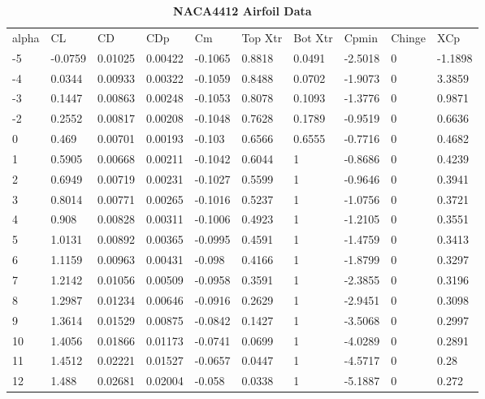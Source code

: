 \begin{singlespace}
\begin{table}[H]
\caption{\textbf{NACA4412 Airfoil Data}} \label{table:NACA4412_raw}
\begin{tabular}{|l|l|l|l|l|l|l|l|l|l|}
alpha & CL      & CD      & CDp     & Cm      & Top Xtr & Bot Xtr & Cpmin   & Chinge & XCp     \\
-5    & -0.0759 & 0.01025 & 0.00422 & -0.1065 & 0.8818  & 0.0491  & -2.5018 & 0      & -1.1898 \\
-4    & 0.0344  & 0.00933 & 0.00322 & -0.1059 & 0.8488  & 0.0702  & -1.9073 & 0      & 3.3859  \\
-3    & 0.1447  & 0.00863 & 0.00248 & -0.1053 & 0.8078  & 0.1093  & -1.3776 & 0      & 0.9871  \\
-2    & 0.2552  & 0.00817 & 0.00208 & -0.1048 & 0.7628  & 0.1789  & -0.9519 & 0      & 0.6636  \\
0     & 0.469   & 0.00701 & 0.00193 & -0.103  & 0.6566  & 0.6555  & -0.7716 & 0      & 0.4682  \\
1     & 0.5905  & 0.00668 & 0.00211 & -0.1042 & 0.6044  & 1       & -0.8686 & 0      & 0.4239  \\
2     & 0.6949  & 0.00719 & 0.00231 & -0.1027 & 0.5599  & 1       & -0.9646 & 0      & 0.3941  \\
3     & 0.8014  & 0.00771 & 0.00265 & -0.1016 & 0.5237  & 1       & -1.0756 & 0      & 0.3721  \\
4     & 0.908   & 0.00828 & 0.00311 & -0.1006 & 0.4923  & 1       & -1.2105 & 0      & 0.3551  \\
5     & 1.0131  & 0.00892 & 0.00365 & -0.0995 & 0.4591  & 1       & -1.4759 & 0      & 0.3413  \\
6     & 1.1159  & 0.00963 & 0.00431 & -0.098  & 0.4166  & 1       & -1.8799 & 0      & 0.3297  \\
7     & 1.2142  & 0.01056 & 0.00509 & -0.0958 & 0.3591  & 1       & -2.3855 & 0      & 0.3196  \\
8     & 1.2987  & 0.01234 & 0.00646 & -0.0916 & 0.2629  & 1       & -2.9451 & 0      & 0.3098  \\
9     & 1.3614  & 0.01529 & 0.00875 & -0.0842 & 0.1427  & 1       & -3.5068 & 0      & 0.2997  \\
10    & 1.4056  & 0.01866 & 0.01173 & -0.0741 & 0.0699  & 1       & -4.0289 & 0      & 0.2891  \\
11    & 1.4512  & 0.02221 & 0.01527 & -0.0657 & 0.0447  & 1       & -4.5717 & 0      & 0.28    \\
12    & 1.488   & 0.02681 & 0.02004 & -0.058  & 0.0338  & 1       & -5.1887 & 0      & 0.272   \\

\end{tabular}
\end{table}
\end{singlespace}
